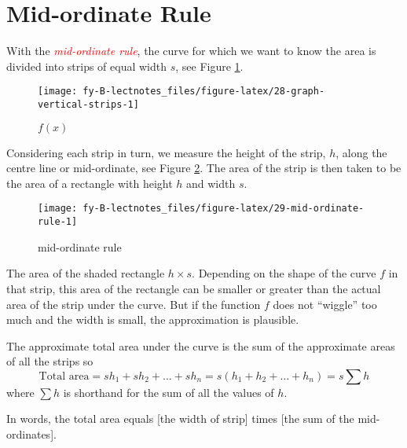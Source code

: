 \documentclass[
  11pt,
  oneside]{book}
\newcommand{\slide}{}
\theoremstyle{definition}
\theoremstyle{definition}
\theoremstyle{definition}
\theoremstyle{definition}
\theoremstyle{remark}
\begin{document}
\slide

\section{Mid-ordinate Rule}\label{mid-ordinate-rule}

With the \textcolor{red}{\em mid-ordinate rule}, the curve for which we want to know the area is divided into strips of equal width \(s\), see Figure \ref{fig:28-graph-vertical-strips}.

\begin{figure}

{\centering \texttt{[image: fy-B-lectnotes\_files/figure-latex/28-graph-vertical-strips-1]} 

}

\caption{$f(x)$}\label{fig:28-graph-vertical-strips}
\end{figure}
\slide

Considering each strip in turn, we measure the height of the strip, \(h\), along the centre line or mid-ordinate, see Figure \ref{fig:29-mid-ordinate-rule}. The area of the strip is then taken to be the area of a rectangle with height \(h\) and width \(s\).

\begin{figure}

{\centering \texttt{[image: fy-B-lectnotes\_files/figure-latex/29-mid-ordinate-rule-1]} 

}

\caption{mid-ordinate rule}\label{fig:29-mid-ordinate-rule}
\end{figure}

\slide

The area of the shaded rectangle \(h \times s\). Depending on the shape of the curve \(f\) in that strip, this area of the rectangle can be smaller or greater than the actual area of the strip under the curve. But if the function \(f\) does not ``wiggle'' too much and the width is small, the approximation is plausible.

\slide

The approximate total area under the curve is the sum of the approximate areas of all the strips so
\[
\text{Total area} = sh_1 + sh_2 + \ldots + sh_n = s(h_1 + h_2 + \ldots + h_n) = s\sum h
\]
where \(\sum h\) is shorthand for the sum of all the values of \(h\).

In words, the total area equals {[}the width of strip{]} times {[}the sum of the mid-ordinates{]}.
\end{document}
